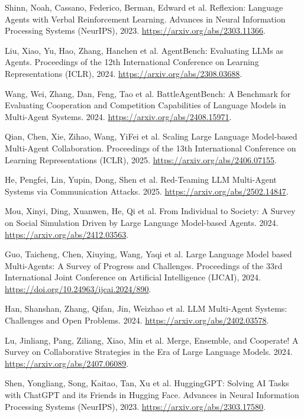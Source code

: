  Shinn, Noah, Cassano, Federico, Berman, Edward et al. Reflexion: Language Agents with Verbal Reinforcement Learning. Advances in Neural Information Processing Systems (NeurIPS), 2023. \url{https://arxiv.org/abs/2303.11366}.

 Liu, Xiao, Yu, Hao, Zhang, Hanchen et al. {AgentBench}: Evaluating {LLM}s as Agents. Proceedings of the 12th International Conference on Learning Representations (ICLR), 2024. \url{https://arxiv.org/abs/2308.03688}.

 Wang, Wei, Zhang, Dan, Feng, Tao et al. {BattleAgentBench}: A Benchmark for Evaluating Cooperation and Competition Capabilities of Language Models in Multi-Agent Systems. 2024. \url{https://arxiv.org/abs/2408.15971}.

 Qian, Chen, Xie, Zihao, Wang, YiFei et al. Scaling Large Language Model-based Multi-Agent Collaboration. Proceedings of the 13th International Conference on Learning Representations (ICLR), 2025. \url{https://arxiv.org/abs/2406.07155}.

 He, Pengfei, Lin, Yupin, Dong, Shen et al. Red-Teaming {LLM} Multi-Agent Systems via Communication Attacks. 2025. \url{https://arxiv.org/abs/2502.14847}.

 Mou, Xinyi, Ding, Xuanwen, He, Qi et al. From Individual to Society: A Survey on Social Simulation Driven by Large Language Model-based Agents. 2024. \url{https://arxiv.org/abs/2412.03563}.

 Guo, Taicheng, Chen, Xiuying, Wang, Yaqi et al. Large Language Model based Multi-Agents: A Survey of Progress and Challenges. Proceedings of the 33rd International Joint Conference on Artificial Intelligence (IJCAI), 2024. \url{https://doi.org/10.24963/ijcai.2024/890}.

 Han, Shanshan, Zhang, Qifan, Jin, Weizhao et al. {LLM} Multi-Agent Systems: Challenges and Open Problems. 2024. \url{https://arxiv.org/abs/2402.03578}.

 Lu, Jinliang, Pang, Ziliang, Xiao, Min et al. Merge, Ensemble, and Cooperate! A Survey on Collaborative Strategies in the Era of Large Language Models. 2024. \url{https://arxiv.org/abs/2407.06089}.

 Shen, Yongliang, Song, Kaitao, Tan, Xu et al. {HuggingGPT}: Solving {AI} Tasks with {ChatGPT} and its Friends in {Hugging Face}. Advances in Neural Information Processing Systems (NeurIPS), 2023. \url{https://arxiv.org/abs/2303.17580}.

